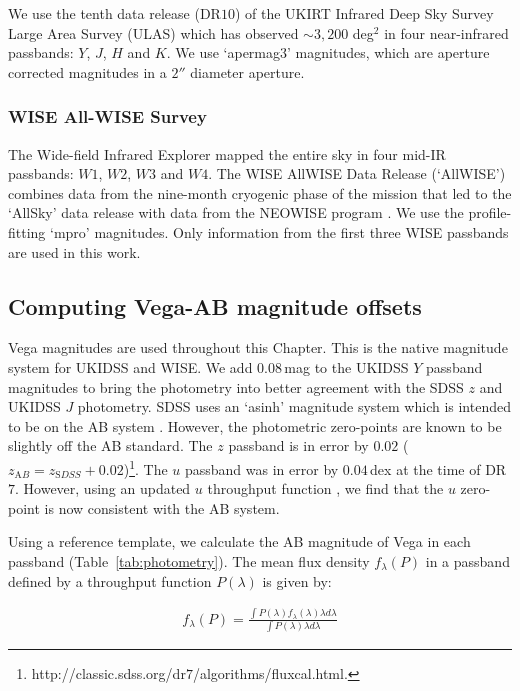 We use the tenth data release (DR$10$) of the UKIRT Infrared Deep Sky Survey \citep[UKIDSS;][]{lawrence07} Large Area Survey (ULAS) which has observed $\sim 3,200$ deg$^2$ in four near-infrared passbands: $Y$, $J$, $H$ and $K$. 
We use `apermag$3$' magnitudes, which are aperture corrected magnitudes in a $2''$ diameter aperture.

\subsubsection{WISE All-WISE Survey}

The Wide-field Infrared Explorer \citep[WISE;][]{wright10} mapped the entire sky in four mid-IR passbands: $W1$, $W2$, $W3$ and $W4$. 
The WISE AllWISE Data Release (`AllWISE') combines data from the nine-month cryogenic phase of the mission that led to the `AllSky' data release with data from the NEOWISE program \citep{mainzer11}. 
We use the profile-fitting `mpro' magnitudes.   
Only information from the first three WISE passbands are used in this work.

\subsection{Computing Vega-AB magnitude offsets}

Vega magnitudes are used throughout this Chapter. 
This is the native magnitude system for UKIDSS and WISE.
We add $0.08$\,mag to the UKIDSS $Y$ passband magnitudes to bring the photometry into better agreement with the SDSS $z$ and UKIDSS $J$ photometry. 
SDSS uses an `asinh' magnitude system \citep{lupton99} which is intended to be on the AB system \citep{oke83}.
However, the photometric zero-points are known to be slightly off the AB standard. 
The $z$ passband is in error by $0.02$ ($z_{\mathrm AB} = z_{\mathrm SDSS} + 0.02$)\footnote{http://classic.sdss.org/dr$7$/algorithms/fluxcal.html.}.
The $u$ passband was in error by $0.04$\,dex at the time of DR$7$. 
However, using an updated $u$ throughput function \citep{doi10}, we find that the $u$ zero-point is now consistent with the AB system. 

Using a reference template, we calculate the AB magnitude of Vega in each passband (Table~\ref{tab:photometry}). 
The mean flux density $f_\lambda(P)$ in a passband defined by a throughput function $P(\lambda)$ is given by: 

\begin{eqnarray}
\label{eq:flux}
  f_\lambda(P) = \frac {\int P(\lambda)f_\lambda(\lambda)\lambda d\lambda} {\int P(\lambda)\lambda d\lambda} 
\end{eqnarray}

